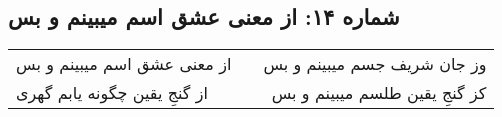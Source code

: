 \begin{center}
\section*{شماره ۱۴: از معنی عشق اسم میبینم و بس}
\label{sec:014}
\begin{longtable}{l p{0.5cm} r}
از معنی عشق اسم میبینم و بس
&&
وز جان شریف جسم میبینم و بس
\\
از گنجِ یقین چگونه یابم گهری
&&
کز گنجِ یقین طلسم میبینم و بس
\\
\end{longtable}
\end{center}
